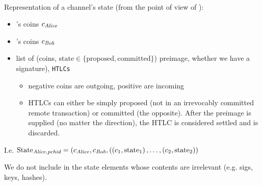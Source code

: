   \ \\

  Representation of a channel's state (from the point of view of \alice):
  \begin{itemize}
    \item \alice's coins $c_{\mathit{Alice}}$
    \item \bob's coins $c_{\mathit{Bob}}$
    \item list of (coins, $\mathrm{state} \in \{\mathrm{proposed},
    \mathrm{committed}\}$) preimage, whether we have a signature),
    \texttt{HTLCs}
    \begin{itemize}
      \item negative coins are outgoing, positive are incoming
      \item HTLCs can either be simply proposed (not in an irrevocably committed
      remote transaction) or committed (the opposite). After the preimage is
      supplied (no matter the direction), the HTLC is considered settled and is
      discarded.
    \end{itemize}
  \end{itemize}
  I.e. $\mathrm{State}_{\mathit{Alice}, \textit{pchid}} = \left(c_{\mathit{Alice}}, c_{\mathit{Bob}},
  \left((c_1, \mathrm{state}_1\right), \dots, \left(c_2,
  \mathrm{state}_2\right)\right)$

  We do not include in the state elements whose contents are irrelevant (e.g.
  sigs, keys, hashes).
